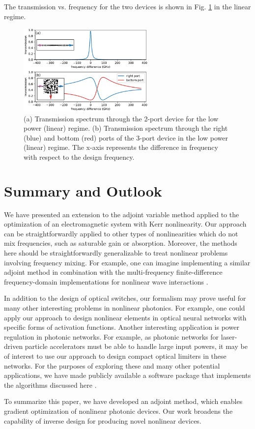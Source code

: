 The transmission vs. frequency for the two devices is shown in Fig. \ref{fig:spectra} in the linear regime.

\begin{figure}[h]
\centering
\includegraphics[width=0.6\textwidth]{figures/angler_spectra_11_2.pdf}
\caption{\label{fig:spectra} (a) Transmission spectrum through the 2-port device for the low power (linear) regime. (b) Transmission spectrum through the right (blue) and bottom (red) ports of the 3-port device in the low power (linear) regime.  The x-axis represents the difference in frequency with respect to the design frequency.}
\end{figure}

\section{Summary and Outlook}

We have presented an extension to the adjoint variable method applied to the optimization of an electromagnetic system with Kerr nonlinearity. Our approach can be straightforwardly applied to other types of nonlinearities which do not mix frequencies, such as saturable gain or absorption. Moreover, the methods here should be straightforwardly generalizable to treat nonlinear problems involving frequency mixing. For example, one can imagine implementing a similar adjoint method in combination with the multi-frequency finite-difference frequency-domain implementations for nonlinear wave interactions \cite{Shi2016multi}. 

In addition to the design of optical switches, our formalism may prove useful for many other interesting problems in nonlinear photonics.  For example, one could apply our approach to design nonlinear elements in optical neural networks \cite{shen2017deep} with specific forms of activation functions.  Another interesting application is power regulation in photonic networks.  For example, as photonic networks for laser-driven particle accelerators \cite{hughes_-chip_2018} must be able to handle large input powers, it may be of interest to use our approach to design compact optical limiters in these networks. For the purposes of exploring these and many other potential applications, we have made publicly available a software package that implements the algorithms discussed here \cite{hughes2018fdfdpy}.

To summarize this paper, we have developed an adjoint method, which enables gradient optimization of nonlinear photonic devices. Our work broadens the capability of inverse design for producing novel nonlinear devices. 

